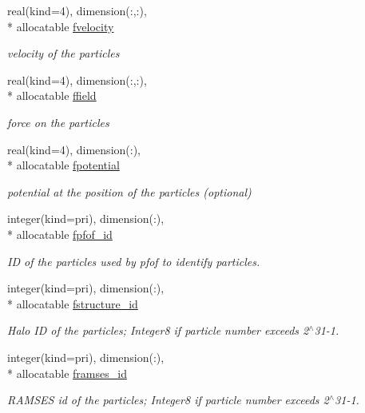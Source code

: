 \begin{DoxyCompactItemize}
real(kind=4), dimension(\-:,\-:), \\*
allocatable \hyperlink{classmodvarcommons_a5c548d805cdaa0c237b5cdd58247b207}{fvelocity}
\begin{DoxyCompactList}\small\item\em velocity of the particles \end{DoxyCompactList}\item 
real(kind=4), dimension(\-:,\-:), \\*
allocatable \hyperlink{classmodvarcommons_a715db5dbf29bce0c1dfa4e5b5d681f5a}{ffield}
\begin{DoxyCompactList}\small\item\em force on the particles \end{DoxyCompactList}\item 
real(kind=4), dimension(\-:), \\*
allocatable \hyperlink{classmodvarcommons_a3ec54ce242c738eb8965506fe283409f}{fpotential}
\begin{DoxyCompactList}\small\item\em potential at the position of the particles (optional) \end{DoxyCompactList}\item 
integer(kind=pri), dimension(\-:), \\*
allocatable \hyperlink{classmodvarcommons_a8ed131ee0f1bd2a33b132ea270741133}{fpfof\-\_\-id}
\begin{DoxyCompactList}\small\item\em I\-D of the particles used by pfof to identify particles. \end{DoxyCompactList}\item 
integer(kind=pri), dimension(\-:), \\*
allocatable \hyperlink{classmodvarcommons_aa3e7819da325f4559abff9dc0359d05d}{fstructure\-\_\-id}
\begin{DoxyCompactList}\small\item\em Halo I\-D of the particles; Integer8 if particle number exceeds 2$^\wedge$31-\/1. \end{DoxyCompactList}\item 
integer(kind=pri), dimension(\-:), \\*
allocatable \hyperlink{classmodvarcommons_a2c11ac48bbedcbc167820223ba89721e}{framses\-\_\-id}
\begin{DoxyCompactList}\small\item\em R\-A\-M\-S\-E\-S id of the particles; Integer8 if particle number exceeds 2$^\wedge$31-\/1. \end{DoxyCompactList}\end{DoxyCompactItemize}



